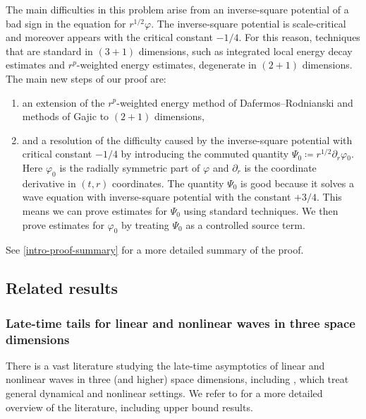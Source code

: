 \documentclass[10pt, reqno]{amsart}
\begin{document}
\begin{remark}
The main difficulties in this problem arise from an inverse-square potential of
a bad sign in the equation for \(r^{1/2}\varphi{}\). The inverse-square
potential is scale-critical and moreover appears with the critical constant
\(-1/4\). For this reason, techniques that are standard in \((3 + 1)\)
dimensions, such as integrated local energy decay estimates and \(r^p\)-weighted
energy estimates, degenerate in \((2 + 1)\) dimensions. The main new steps of
our proof are:
\begin{enumerate}
\item an extension of the \(r^p\)-weighted energy method of Dafermos--Rodnianski
\cite{rp-method} and methods of Gajic \cite{GAJIC2023110058} to \((2 + 1)\)
dimensions,
\item and a resolution of the difficulty caused by the inverse-square potential
with critical constant \(-1/4\) by introducing the commuted quantity
\(\Psi{}_0\coloneqq{}r^{1/2}\partial{}_r\varphi{}_0\). Here \(\varphi_0\) is
the radially symmetric part of \(\varphi{}\) and \(\partial_r\) is the
coordinate derivative in \((t,r)\) coordinates. The quantity \(\Psi_0\) is
good because it solves a wave equation with inverse-square potential with the
constant \(+ 3/4\). This means we can prove estimates for
\(\Psi_0\) using standard techniques. We then prove estimates for
\(\varphi_0\) by treating \(\Psi_0\) as a controlled source term.
\end{enumerate}
See \cref{intro-proof-summary} for a more detailed summary of the proof.
\label{proof-comment}
\end{remark}
\subsection{Related results}
\subsubsection{Late-time tails for linear and nonlinear waves in three space dimensions}
\label{intro-tails-3}
There is a vast literature studying the late-time asymptotics of linear and
nonlinear waves in three (and higher) space dimensions, including
\cite{hintz2023linearwavesasymptoticallyflat,luk-oh-tails,gajic2025linearnonlinearlatetimetails},
which treat general dynamical and nonlinear settings. We refer to
\cite[Sec.~1.3]{luk-oh-tails} for a more detailed overview of the literature,
including upper bound results.
\end{document}
